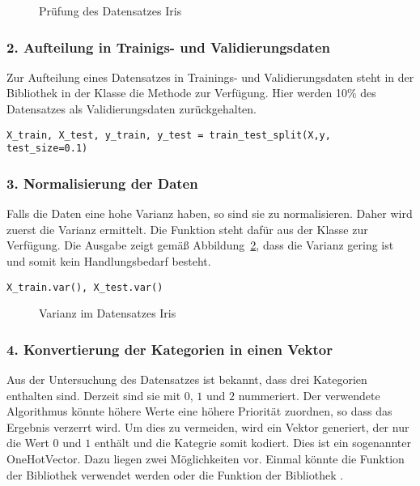 \begin{figure}[H]
	\caption{Prüfung des Datensatzes Iris}\label{TensorFlowIrisInfo}
\end{figure}


\subsubsection{2. Aufteilung in Trainigs- und Validierungsdaten}

Zur Aufteilung eines Datensatzes  in Trainings- und Validierungsdaten steht in der Bibliothek
 in der Klasse  die Methode 
zur Verfügung. Hier werden 10\% des Datensatzes als Validierungsdaten zurückgehalten.

\begin{verbatim}
X_train, X_test, y_train, y_test = train_test_split(X,y, test_size=0.1)
\end{verbatim}

\subsubsection{3. Normalisierung der Daten}

Falls die Daten eine hohe Varianz haben, so sind sie zu normalisieren. Daher wird zuerst die Varianz ermittelt.
Die Funktion  steht dafür aus der Klasse  zur Verfügung. Die Ausgabe zeigt
gemäß Abbildung~\ref{TensorFlowIrisVar}, dass die Varianz gering ist und somit kein Handlungsbedarf besteht.

\begin{verbatim}
X_train.var(), X_test.var()
\end{verbatim}


\begin{figure}[H]
	\caption{Varianz im Datensatzes Iris}\label{TensorFlowIrisVar}
\end{figure}

\subsubsection{4. Konvertierung der Kategorien in einen Vektor}

Aus der Untersuchung des Datensatzes ist bekannt, dass drei Kategorien enthalten sind. Derzeit sind
sie mit $0$, $1$ und $2$ nummeriert. Der verwendete Algorithmus könnte höhere Werte eine höhere Priorität 
zuordnen, so dass das Ergebnis verzerrt wird. Um dies zu vermeiden, wird ein Vektor generiert, der nur die
Wert $0$ und $1$ enthält und die Kategrie somit kodiert. Dies ist ein sogenannter \glqq OneHotVector\grqq{}.
Dazu liegen zwei Möglichkeiten vor. Einmal könnte die Funktion  der Bibliothek
 verwendet werden oder die Funktion  der Bibliothek .



